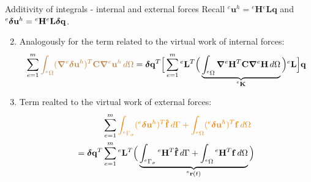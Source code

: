 \documentclass[aspectratio=169]{beamer}
\begin{document}
\begin{frame}{Additivity of integrals - internal and external forces}
  Recall $^e\mathbf u^h={}^e\mathbf H{}^e\mathbf L \mathbf q$ and ${}^e \boldsymbol\delta \mathbf{u}^h = {}^e\mathbf{H}{}^e\mathbf L \boldsymbol\delta\mathbf{q}$.
  \vspace{0.5cm}
  \begin{enumerate}
    \setcounter{enumi}{1}
    \item  Analogously for the term related to the virtual work of internal forces:
          \[
            \sum_{e=1}^m {\color{brown}\int_{{}^e\Omega} (\boldsymbol{\nabla} {}^e\boldsymbol\delta\mathbf u^{h} )^{T} \mathbf C\boldsymbol{\nabla} {}^e\mathbf u^{h}\, d\Omega }=\boldsymbol\delta\mathbf{q}^T \Big[\sum_{e=1}^m {}^e\mathbf L^T\Big(\underbrace{\int_{{}^e\Omega}\boldsymbol{\nabla}{}^e\mathbf H^{T}\mathbf C\boldsymbol{\nabla}{}^e\mathbf H\, d\Omega}_\text{${}^e\mathbf K$}\Big) {}^e\mathbf L\Big] \mathbf{q}
          \]
    \item  Term realted to the virtual work of external forces:
          \begin{align*}
             & \sum_{e=1}^m {\color{orange}\int_{{}^e\Gamma_\sigma} ({}^e\boldsymbol\delta\mathbf u^{h})^{T}\mathbf{\hat f} \, d\Gamma+\int_{{}^e\Omega}  ({}^e\boldsymbol\delta\mathbf u^{h})^{T}\mathbf f\, d\Omega} \\                                                                  =\boldsymbol\delta\mathbf{q}^T &\sum_{e=1}^m {}^e\mathbf L^T\Big(\underbrace{\int_{{}^e\Gamma_\sigma} {}^e\mathbf H^{T}\mathbf{\hat f} \, d\Gamma+\int_{{}^e\Omega} {}^e\mathbf H^{T}\mathbf f\, d\Omega }_\text{${}^e\mathbf r(t)$}\Big)
          \end{align*}
  \end{enumerate}
\end{frame}
\end{document}
